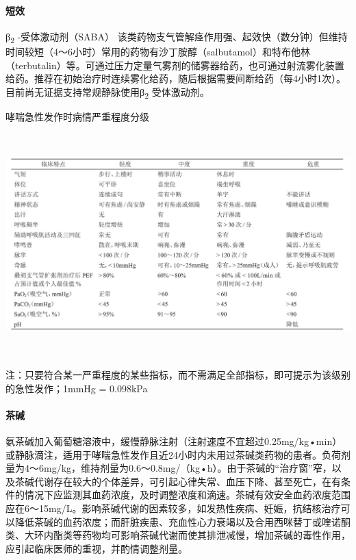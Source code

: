 \paragraph{短效}

β\textsubscript{2} -受体激动剂（SABA）
该类药物支气管解痉作用强、起效快（数分钟）但维持时间较短（4～6小时）常用的药物有沙丁胺醇（salbutamol）和特布他林（terbutalin）等。可通过压力定量气雾剂的储雾器给药，也可通过射流雾化装置给药。推荐在初始治疗时连续雾化给药，随后根据需要间断给药（每4小时1次）。目前尚无证据支持常规静脉使用β\textsubscript{2}
受体激动剂。

\begin{table}[htbp]
{\centering
\caption{哮喘急性发作时病情严重程度分级}
\label{tab95-1}
\includegraphics[width=6.70833in,height=3.38542in]{./images/Image00394.jpg}}

{\small 
注：只要符合某一严重程度的某些指标，而不需满足全部指标，即可提示为该级别的急性发作；1mmHg
= 0.098kPa
}
\end{table}



\paragraph{茶碱}

氨茶碱加入葡萄糖溶液中，缓慢静脉注射（注射速度不宜超过0.25mg/kg•min）或静脉滴注，适用于哮喘急性发作且近24小时内未用过茶碱类药物的患者。负荷剂量为4～6mg/kg，维持剂量为0.6～0.8mg/（kg•h）。由于茶碱的“治疗窗”窄，以及茶碱代谢存在较大的个体差异，可引起心律失常、血压下降、甚至死亡，在有条件的情况下应监测其血药浓度，及时调整浓度和滴速。茶碱有效安全血药浓度范围应在6～15mg/L。影响茶碱代谢的因素较多，如发热性疾病、妊娠，抗结核治疗可以降低茶碱的血药浓度；而肝脏疾患、充血性心力衰竭以及合用西咪替丁或喹诺酮类、大环内酯类等药物均可影响茶碱代谢而使其排泄减慢，增加茶碱的毒性作用，应引起临床医师的重视，并酌情调整剂量。

